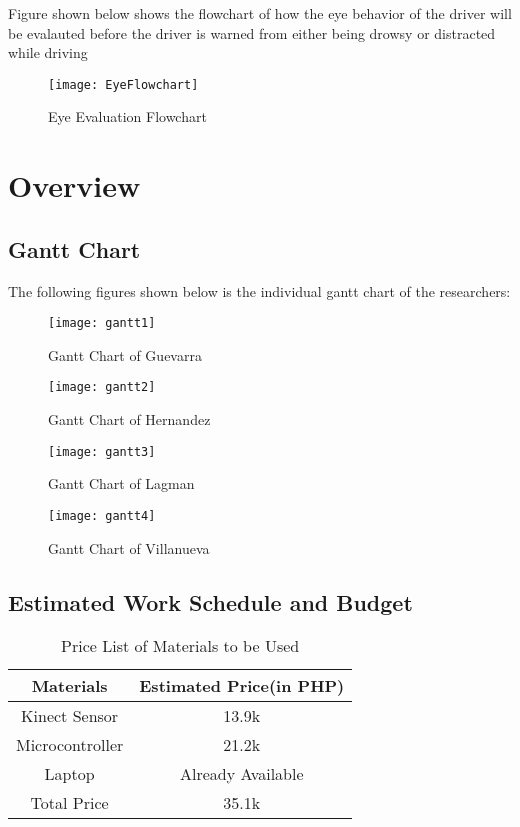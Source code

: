 Figure shown below shows the flowchart of how the eye behavior of the driver will be evalauted before the driver is warned from either being drowsy or distracted while driving
\begin{center}
\begin{figure}[ht]
	\centering
	\texttt{[image: EyeFlowchart]}
	\caption{Eye Evaluation Flowchart}
\end{figure}


\end{center}


\section{Overview}

\subsection{Gantt Chart}
The following figures shown below is the individual gantt chart of the researchers:

\begin{figure}[!htb]
	\centering
	\texttt{[image: gantt1]}
	\caption{Gantt Chart of Guevarra}
\end{figure}
\begin{figure}[!htb]
	\centering
	\texttt{[image: gantt2]}
	\caption{Gantt Chart of Hernandez}
\end{figure}
\begin{figure}[!htb]
	\centering
	\texttt{[image: gantt3]}
	\caption{Gantt Chart of Lagman}
\end{figure}
\begin{figure}[!htb]
	\centering
	\texttt{[image: gantt4]}
	\caption{Gantt Chart of Villanueva}
\end{figure}

\subsection{Estimated Work Schedule and Budget}
\begin{table}[!htb]
	\caption{Price List of Materials to be Used}
	\centering
	\begin{tabular}{|c|c|}
		\hline
		Materials & Estimated Price(in PHP) \\
		\hline
		Kinect Sensor & 13.9k \\
		\hline
		Microcontroller & 21.2k \\
		\hline
		Laptop & Already Available \\
		\hline
		Total Price & 35.1k \\
		\hline
	\end{tabular}
\end{table}